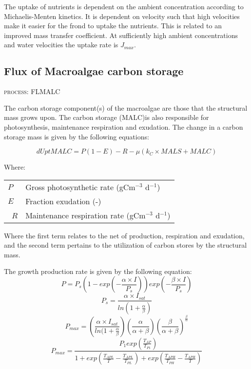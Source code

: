 \documentclass{deltares_manual}
\begin{document}
The uptake of nutrients is dependent on the ambient concentration according to Michaelis-Menten kinetics. It is dependent on velocity such that high velocities make it easier for the frond to uptake the nutrients. This is related to an improved mass transfer coefficient. At sufficiently high ambient concentrations and water velocities the uptake rate is $J_{max}$.

\subsection{Flux of Macroalgae carbon storage}
\begin{flushright}
\textsc{process: FLMALC}
\end{flushright}

The carbon storage component(s) of the macroalgae are those that the structural mass grows upon. The carbon storage (MALC)is also responsible for photosynthesis, maintenance respiration and exudation. The change in a carbon storage mass is given by the following equations:

\[dUptMALC = P(1-E)-R - \mu(k_C \times MALS + MALC)\]

Where:
\begin{tabular}{ll}
$P$ & Gross photosynthetic rate (gCm$^{-3}$ d$^{-1}$)\\
$E$ & Fraction exudation (-)\\\
$R$ & Maintenance respiration rate (gCm$^{-3}$ d$^{-1}$)\\
\end{tabular}

Where the first term relates to the net of production, respiration and exudation, and the second term pertains to the utilization of carbon stores by the structural mass.

The growth production rate is given by the following equation:
\[P = P_s(1-exp(-\frac{\alpha \times I}{P_s}))exp(-\frac{\beta \times I}{P_s})\]
\[P_s = \frac{\alpha \times I_{sat}}{ln(1+\frac{\alpha}{\beta})}\]
\[P_{max} = (\frac{\alpha \times I_{sat}}{ln(1+\frac{\alpha}{\beta}})(\frac{\alpha}{\alpha+\beta})(\frac{\beta}{\alpha+\beta})^{\frac{\beta}{\alpha}}\]
\[P_{max} = \frac{P_1exp(\frac{T_{AP}}{T_{P1}})}{1+exp(\frac{T_{APL}}{T} - \frac{T_{APL}}{T_{PL}})+exp(\frac{T_{APH}}{T_{PH}}-\frac{T_{APH}}{T})}\]
\end{document}
